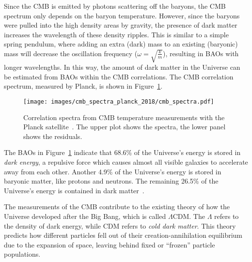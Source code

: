 Since the CMB is emitted by photons scattering off the baryons, the CMB spectrum only depends on the baryon temperature.
However, since the baryons were pulled into the high density areas by gravity, the presence of dark matter increases the wavelength of these density ripples.
This is similar to a simple spring pendulum, where adding an extra (dark) mass to an existing (baryonic) mass will decrease the oscillation frequency ($\omega = \sqrt{\frac{k}{m}}$), resulting in BAOs with longer wavelengths.
In this way, the amount of dark matter in the Universe can be estimated from BAOs within the CMB correlations.
The CMB correlation spectrum, measured by Planck, is shown in Figure~\ref{fig:cmb_correlation_spectra}.

\begin{figure}[t]
  \centering
  \texttt{[image: images/cmb\_spectra\_planck\_2018/cmb\_spectra.pdf]}
  \caption[Cosmic Microwave Background Correlation Spectrum]{
    Correlation spectra from CMB temperature measurements with the Planck satellite~\cite{planck_dm_limit}.
    The upper plot shows the spectra, the lower panel shows the residuals.
  }
  \label{fig:cmb_correlation_spectra}
\end{figure}

The BAOs in Figure~\ref{fig:cmb_correlation_spectra} indicate that 68.6\% of the Universe's energy is stored in \textit{dark energy}, a repulsive force which causes almost all visible galaxies to accelerate away from each other.
Another 4.9\% of the Universe's energy is stored in baryonic matter, like protons and neutrons.
The remaining 26.5\% of the Universe's energy is contained in dark matter~\cite{planck2015}.

The measurements of the CMB contribute to the existing theory of how the Universe developed after the Big Bang, which is called $\Lambda$CDM.
The $\Lambda$ refers to the density of dark energy, while CDM refers to \textit{cold dark matter}.
This theory predicts how different particles fell out of their creation-annihilation equilibrium due to the expansion of space, leaving behind fixed or ``frozen'' particle populations.

%   

